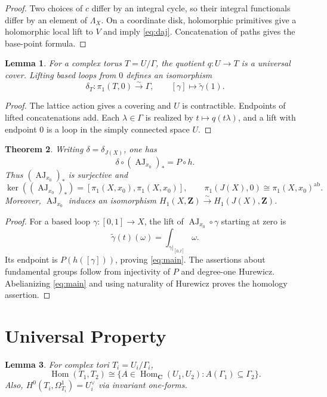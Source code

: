 \documentclass[11pt]{article}
\numberwithin{equation}{section}
\newtheorem{theorem}{Theorem}[section]
\newtheorem{lemma}[theorem]{Lemma}
\theoremstyle{definition}
\newcommand{\Z}{\mathbf Z}
\newcommand{\C}{\mathbf C}
\newcommand{\AJ}{\operatorname{AJ}}
\newcommand{\Hom}{\operatorname{Hom}}
\newcommand{\ab}{\mathrm{ab}}
\begin{document}
\begin{proof}
Two choices of $c$ differ by an integral cycle, so their integral
functionals differ by an element of $\Lambda_X$. On a coordinate disk,
holomorphic primitives give a holomorphic local lift to $V$ and imply
\eqref{eq:daj}. Concatenation of paths gives the base-point formula.
\end{proof}

\begin{lemma}\label{lem:cover}
For a complex torus $T=U/\Gamma$, the quotient $q:U\to T$ is a universal
cover. Lifting based loops from $0$ defines an isomorphism
\[
 \delta_T:\pi_1(T,0)\xrightarrow{\sim}\Gamma,\qquad
 [\gamma]\longmapsto\widetilde\gamma(1).
\]
\end{lemma}

\begin{proof}
The lattice action gives a covering and $U$ is contractible. Endpoints
of lifted concatenations add. Each $\lambda\in\Gamma$ is realized by
$t\mapsto q(t\lambda)$, and a lift with endpoint $0$ is a loop in the
simply connected space $U$.
\end{proof}

\begin{theorem}\label{thm:abelianization}
Writing $\delta=\delta_{J(X)}$, one has
\begin{equation}\label{eq:main}
 \delta\circ(\AJ_{x_0})_*=P\circ h.
\end{equation}
Thus $(\AJ_{x_0})_*$ is surjective and
\[
 \ker((\AJ_{x_0})_*)=[\pi_1(X,x_0),\pi_1(X,x_0)],\qquad
 \pi_1(J(X),0)\cong\pi_1(X,x_0)^{\ab}.
\]
Moreover, $\AJ_{x_0}$ induces an isomorphism
$H_1(X,\Z)\xrightarrow{\sim}H_1(J(X),\Z)$.
\end{theorem}

\begin{proof}
For a based loop $\gamma:[0,1]\to X$, the lift of
$\AJ_{x_0}\circ\gamma$ starting at zero is
\[
 \widetilde\gamma(t)(\omega)=\int_{\gamma|_{[0,t]}}\omega.
\]
Its endpoint is $P(h([\gamma]))$, proving \eqref{eq:main}.
The assertions about fundamental groups follow from injectivity of $P$
and degree-one Hurewicz. Abelianizing \eqref{eq:main} and using naturality
of Hurewicz proves the homology assertion.
\end{proof}

\section{Universal Property}

\begin{lemma}\label{lem:linear}
For complex tori $T_i=U_i/\Gamma_i$,
\[
 \Hom(T_1,T_2)\cong
 \{A\in\Hom_{\C}(U_1,U_2):A(\Gamma_1)\subseteq\Gamma_2\}.
\]
Also, $H^0(T_i,\Omega_{T_i}^1)=U_i^\vee$ via invariant one-forms.
\end{lemma}
\end{document}
